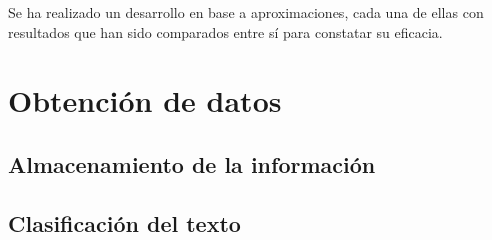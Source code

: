 

Se ha realizado un desarrollo en base a aproximaciones, cada una de ellas con resultados que han sido comparados entre sí para constatar su eficacia.

\section{Obtención de datos}






\subsection{Almacenamiento de la información}


\subsection{Clasificación del texto}

